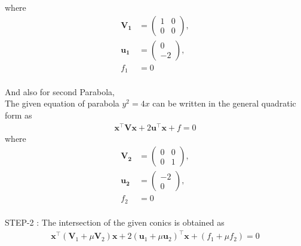 \documentclass[journal,12pt,twocolumn]{IEEEtran}
\newcommand{\myvec}[1]{\ensuremath{\begin{pmatrix}#1\end{pmatrix}}}
\let\vec\mathbf
\let\vec\mathbf
\providecommand{\brak}[1]{\ensuremath{\left(#1\right)}}
\begin{document}
where
\begin{align}
 \vec{V_1} &= \myvec{1 & 0\\0 & 0},
 \label{eq-2-} 
 \\
 \vec{u_1} &= \myvec{0\\-2},
 \label{eq-3-} 
 \\
 f_1 &= 0
 \label{eq-4-} 
\end{align}
\\
And also for second Parabola,\\
The given equation of parabola $y^2 = 4x$ can be written in the general quadratic form as
\begin{align}
    \label{eq:conic_quad_form}
    \vec{x}^{\top}\vec{V}\vec{x}+2\vec{u}^{\top}\vec{x}+f=0
    \end{align}
where
\begin{align}
 \vec{V_2} &= \myvec{0 & 0\\0 & 1},
 \label{eq-6-} 
 \\
 \vec{u_2} &= \myvec{-2\\ 0},
 \label{eq-7-} 
 \\
 f_2 &= 0
 \label{eq-8-}  
\end{align}
\\
STEP-2 :
The intersection of the given conics is obtained
as\\
\begin{align}
	\vec{x}^{\top}\brak{\vec{V}_1 + \mu\vec{V}_2}\vec{x}+2 \brak{\vec{u}_1+\mu \vec{u}_2}^{\top} \vec{x} 
	+ \brak{f_1+\mu f_2}= 0
	\\
    \end{align}
    
\end{document}
